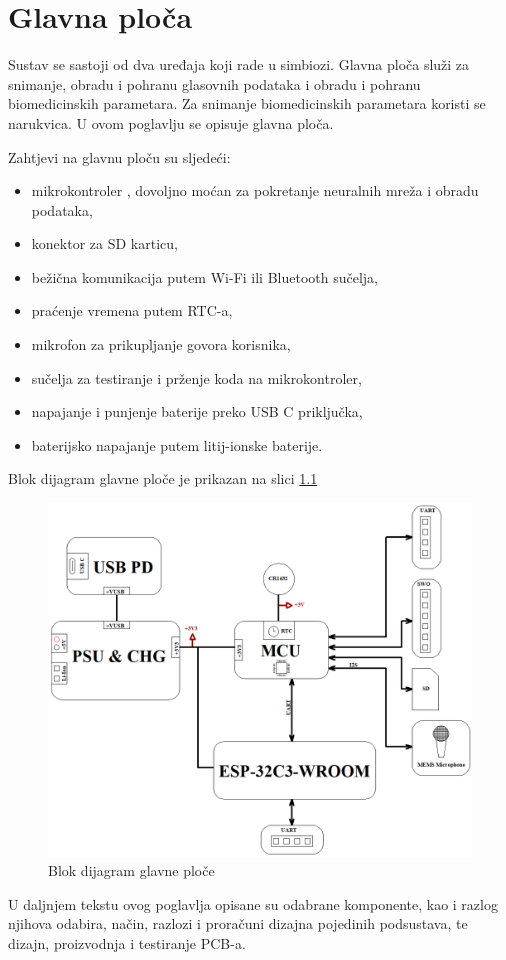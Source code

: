 \chapter{Glavna ploča}
\label{pog:mainboard}

Sustav se sastoji od dva uređaja koji rade u simbiozi. Glavna ploča služi za snimanje, obradu i pohranu glasovnih podataka i obradu i pohranu biomedicinskih parametara. Za snimanje biomedicinskih parametara koristi se narukvica. U ovom poglavlju se opisuje glavna ploča.

Zahtjevi na glavnu ploču su sljedeći:
\begin{itemize}
    \item mikrokontroler , dovoljno moćan za pokretanje neuralnih mreža i obradu podataka,
    \item konektor za SD karticu,
    \item bežična komunikacija putem Wi-Fi ili Bluetooth sučelja,
    \item praćenje vremena putem RTC-a,
    \item mikrofon za prikupljanje govora korisnika,
    \item sučelja za testiranje i prženje koda na mikrokontroler,
    \item napajanje i punjenje baterije preko USB C priključka,
    \item baterijsko napajanje putem litij-ionske baterije.
\end{itemize}
Blok dijagram glavne ploče je prikazan na slici \ref{slk:MB_BD}
\begin{figure}[htb]
    \centering
    \includegraphics[width=\textwidth]{Figures/MB_BD.png}
    \caption{Blok dijagram glavne ploče}
    \label{slk:MB_BD}
\end{figure}
U daljnjem tekstu ovog poglavlja opisane su odabrane komponente, kao i razlog njihova odabira, način, razlozi i proračuni dizajna pojedinih podsustava, te dizajn, proizvodnja i testiranje PCB-a.

